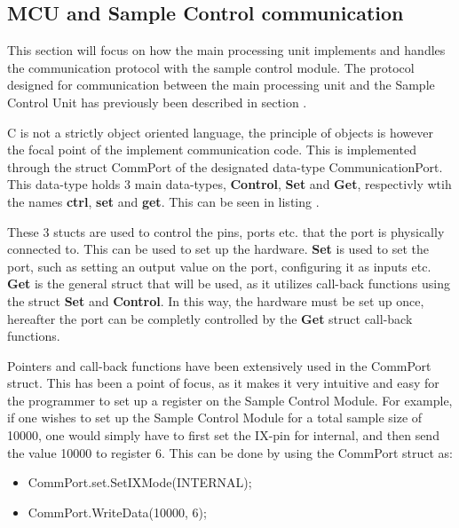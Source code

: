 \subsection{MCU and Sample Control communication} \label{subsec:MCUSCCommunication} 
This section will focus on how the main processing unit implements and handles the communication protocol with the sample control module. 
The protocol designed for communication between the main processing unit and the Sample Control Unit has previously been described in section .

C is not a strictly object oriented language, the principle of objects is however the focal point of the implement communication code. This is implemented through the struct CommPort of the designated data-type CommunicationPort. This data-type holds 3 main data-types, \textbf{Control}, \textbf{Set} and \textbf{Get}, respectivly wtih the names \textbf{ctrl}, \textbf{set} and \textbf{get}. This can be seen in listing .



These 3 stucts are used to control the pins, ports etc. that the port is physically connected to. This can be used to set up the hardware. \textbf{Set} is used to set the port, such as setting an output value on the port, configuring it as inputs etc. \textbf{Get} is the general struct that will be used, as it utilizes call-back functions using the struct \textbf{Set} and \textbf{Control}. In this way, the hardware must be set up once, hereafter the port can be completly controlled by the \textbf{Get} struct call-back functions. 

Pointers and call-back functions have been extensively used in the CommPort struct. This has been a point of focus, as it makes it very intuitive and easy for the programmer to set up a register on the Sample Control Module. For example, if one wishes to set up the Sample Control Module for a total sample size of 10000, one would simply have to first set the IX-pin for internal, and then send the value 10000 to register 6. This can be done by using the CommPort struct as:

\begin{itemize}
    \item CommPort.set.SetIXMode(INTERNAL);
    \item CommPort.WriteData(10000, 6);
\end{itemize}

